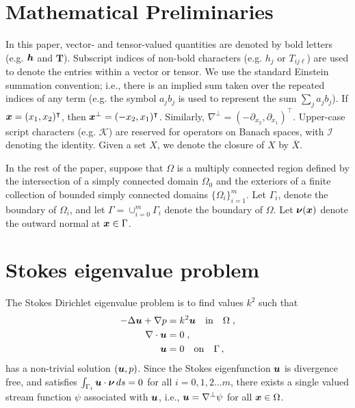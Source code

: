 \section{Mathematical Preliminaries}
\label{sec:prelim}
In this paper, vector- and tensor-valued quantities
are denoted by bold letters (e.g. ${\boldsymbol h}$ and $\mathbf{T}$). 
Subscript indices of non-bold characters (e.g. $h_j$ or $T_{ij\ell}$)
are used to denote the entries within a vector or tensor.
We use the standard Einstein summation convention; i.e., 
there is an implied sum taken over the repeated indices of 
any term (e.g. the symbol $a_{j} b_{j}$ is used to represent the sum
$\sum_{j} a_{j} b_{j}$).
If ${\boldsymbol x} = (x_1,x_2)^\intercal$, then ${\boldsymbol x}^\bot = (-x_2,x_1)^\intercal$.
Similarly, $\nabla^\bot = (-\partial_{x_2},\partial_{x_1})^\intercal$.
Upper-case script characters (e.g. $\mathcal{K}$) are reserved for
operators on Banach spaces, with $\mathcal{I}$ denoting the
identity. Given a set $X$, we denote the closure of $X$
by $\overline{X}$.

In the rest of the paper, 
suppose that $\Omega$ is a multiply connected region defined by
the intersection of a simply connected domain $\Omega_{0}$ 
and the exteriors of a finite collection of bounded
simply connected domains $\{ \Omega_{i} \}_{i=1}^{m}$. 
Let $\Gamma_{i}$, denote the boundary of $\Omega_{i}$, and 
let $\Gamma = \cup_{i=0}^{m} \Gamma_{i}$ denote the boundary of $\Omega$.
Let ${\boldsymbol \nu}({\boldsymbol x})$ denote the outward normal at ${\boldsymbol x} \in \Gamma$.

\section{Stokes eigenvalue problem}
The Stokes Dirichlet eigenvalue problem is to find values $k^2$ such that
\begin{equation}
\begin{aligned}
  -\Delta {\boldsymbol u} + \nabla p &= k^2 {\boldsymbol u} \quad \textrm{in} \quad
  \Omega \label{eq:ostokes} \; , \\
  \nabla \cdot {\boldsymbol u} &= 0 \; , \\
  {\boldsymbol u} &=0 \quad \textrm{on} \quad \Gamma \, ,
\end{aligned}
\end{equation}
has a non-trivial solution $({\boldsymbol u},p)$.
Since the Stokes eigenfunction ${\boldsymbol u}$ is divergence free, 
and satisfies 
$\int_{\Gamma_{i}} {\boldsymbol u} \cdot {\boldsymbol \nu} \, ds = 0$ 
for all $i=0,1,2\ldots m$, there exists a single valued
stream function $\psi$ associated with ${\boldsymbol u}$, i.e., 
${\boldsymbol u} = \nabla^{\perp} \psi$ for all ${\boldsymbol x} \in \Omega$.  

